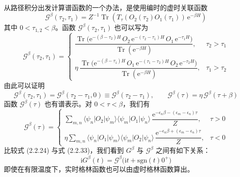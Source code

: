 从路径积分出发计算谱函数的一个办法，是使用编时的虚时关联函数
\begin{equation*}
\mathcal{G}^{\beta}(\tau_2, \tau_1) = Z^{-1}\operatorname{Tr}\left( T_{\tau}(O_2(\tau_2)O_1(\tau_1))\, \mathrm{e}^{-\beta H} \right)
\end{equation*}
其中 $0 < \tau_{1,2} < \beta$。函数 $\mathcal{G}^{\beta}(\tau_2, \tau_1)$ 也可以写为
\begin{equation*}
\mathcal{G}^{\beta}(\tau_2, \tau_1) =
\begin{cases}
\dfrac{\operatorname{Tr}\bigl(\mathrm{e}^{-(\beta - \tau_2)H}\, O_2\, \mathrm{e}^{-(\tau_2 - \tau_1)H}\, O_1\, \mathrm{e}^{-\tau_1 H}\bigr)}{\operatorname{Tr}(\mathrm{e}^{-\beta H})}, & \tau_2 > \tau_1 \\[3ex]
\eta\, \dfrac{\operatorname{Tr}\bigl(\mathrm{e}^{-(\beta - \tau_1)H}\, O_1\, \mathrm{e}^{-(\tau_1 - \tau_2)H}\, O_2\, \mathrm{e}^{-\tau_2 H}\bigr)}{\operatorname{Tr}(\mathrm{e}^{-\beta H})}, & \tau_1 > \tau_2
\end{cases}
\end{equation*}
由此可以证明
\begin{equation*}
\mathcal{G}^{\beta}(\tau_2, \tau_1) = \mathcal{G}^{\beta}(\tau_2 - \tau_1, 0) \equiv \mathcal{G}^{\beta}(\tau_2 - \tau_1), \qquad \mathcal{G}^{\beta}(\tau) = \eta\, \mathcal{G}^{\beta}(\tau + \beta)
\end{equation*}
函数 $\mathcal{G}^{\beta}(\tau)$ 也有谱表示。对 $0 < \tau < \beta$，我们有
\begin{equation*}
\mathcal{G}^{\beta}(\tau) =
\begin{cases}
\sum\limits_{m,n} \langle\psi_n|O_2|\psi_m\rangle\langle\psi_m|O_1|\psi_n\rangle\, \dfrac{\mathrm{e}^{-\epsilon_n\beta - (\epsilon_m - \epsilon_n)\tau}}{Z}, & \tau > 0 \\[3ex]
\eta \sum\limits_{m,n} \langle\psi_n|O_1|\psi_m\rangle\langle\psi_m|O_2|\psi_n\rangle\, \dfrac{\mathrm{e}^{-\epsilon_n\beta + (\epsilon_m - \epsilon_n)\tau}}{Z}, & \tau < 0
\end{cases} \tag{2.2.33}
\end{equation*}
比较式 (2.2.24) 与式 (2.2.33)，我们看到 $G^{\beta}$ 与 $\mathcal{G}^{\beta}$ 之间有如下关系：
\begin{equation*}
\boxed{\; \mathrm{i}G^{\beta}(t) = \mathcal{G}^{\beta}\bigl(\mathrm{i}t + \mathrm{sgn}(t)0^{+}\bigr) \;} \tag{2.2.34}
\end{equation*}
即使在有限温度下，实时格林函数也可以由虚时格林函数算出。

